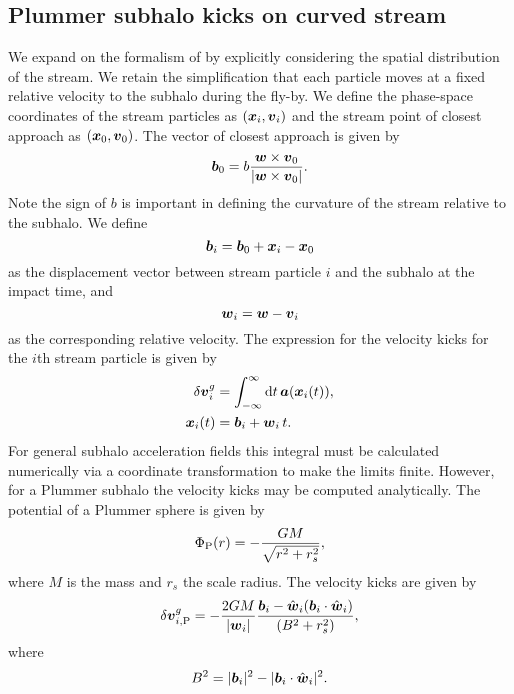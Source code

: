 \documentclass[useAMS,usenatbib,fleqn,a4paper]{mn2e}
\def\d{{\rm d}}
\newcommand{\bs}[1]{\bmath{#1}}
\begin{document}
\subsection{Plummer subhalo kicks on curved stream}
We expand on the formalism of \cite{ErkalBelokurov2015} by explicitly considering the spatial distribution of the stream. We retain the simplification that each particle moves at a fixed relative velocity to the subhalo during the fly-by. We define the phase-space coordinates of the stream particles as $(\bs{x}_i,\bs{v}_i)$ and the stream point of closest approach as $(\bs{x}_0,\bs{v}_0)$. The vector of closest approach is given by
\begin{equation}
\bs{b}_0=b\frac{\bs{w}\times\bs{v}_0}{|\bs{w}\times\bs{v}_0|}.
\end{equation}
Note the sign of $b$ is important in defining the curvature of the stream relative to the subhalo. We define
\begin{equation}
\bs{b}_i = \bs{b}_0+\bs{x}_i-\bs{x}_0
\end{equation}
as the displacement vector between stream particle $i$ and the subhalo at the impact time, and
\begin{equation}
\bs{w}_i=\bs{w}-\bs{v}_i
\end{equation}
as the corresponding relative velocity. The expression for the velocity kicks for the $i$th stream particle is given by
\begin{equation}
\begin{split}
\delta\bs{v}^g_i &= \int_{-\infty}^{\infty} \d t\,\bs{a}(\bs{x}_i(t)),\\
\bs{x}_i(t)&=\bs{b}_i+\bs{w}_i\,t.
\end{split}
\end{equation}For general subhalo acceleration fields this integral must be calculated numerically via a coordinate transformation to make the limits finite. However, for a Plummer subhalo the velocity kicks may be computed analytically. The potential of a Plummer sphere is given by
\begin{equation}
\Phi_{\rm P}(r) = -\frac{GM}{\sqrt{r^2+r_s^2}},
\end{equation}
where $M$ is the mass and $r_s$ the scale radius. The velocity kicks are given by
\begin{equation}
\delta\bs{v}^{g}_{i,\mathrm{P}} = -\frac{2GM}{|\bs{w}_i|}
\frac{\bs{b}_i-\hat{\bs{w}}_i(\bs{b}_i\cdot\hat{\bs{w}}_i)}
{(B^2+r_s^2)},
\label{curved}
\end{equation}
where
\begin{equation}
B^2=|\bs{b}_i|^2
-|\bs{b}_i\cdot\hat{\bs{w}}_i|^2.
\end{equation}
\end{document}
